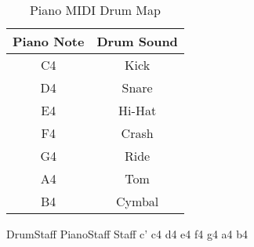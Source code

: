 \documentclass{article}
\begin{document}
\begin{table}[h]
  \centering
  \begin{tabular}{|c|c|}
    \hline
    Piano Note & Drum Sound \\
    \hline
    C4 & Kick \\
    D4 & Snare \\
    E4 & Hi-Hat \\
    F4 & Crash \\
    G4 & Ride \\
    A4 & Tom \\
    B4 & Cymbal \\
    \hline
  \end{tabular}
  \caption{Piano MIDI Drum Map}
\end{table}

\begin{score}
  \new DrumStaff  {
  }
  \new PianoStaff {
    \new Staff  {
      \relative c' {
        c4 d4 e4 f4 g4 a4 b4
      }
    }
  }
  \layout { }
\end{score}
\end{document}
